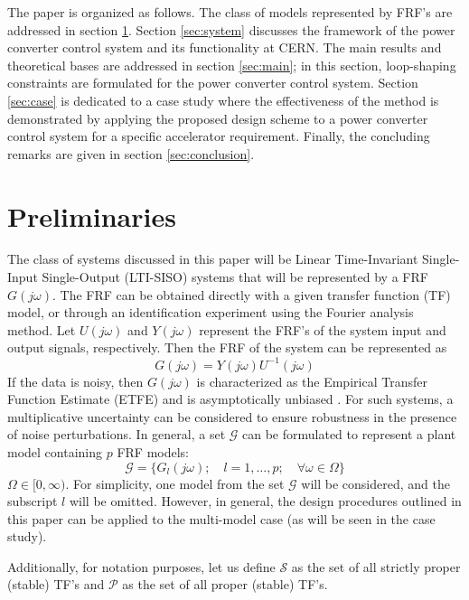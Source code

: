 \documentclass[a4paper, 10pt, conference]{ieeeconf}
\newcommand{\jo}{(j\omega)}
\begin{document}
The paper is organized as follows. The class of models represented by FRF's are addressed in section \ref{sec:prelim}. Section \ref{sec:system} discusses the framework of the power converter control system and its functionality at CERN. The main results and theoretical bases are addressed in section \ref{sec:main}; in this section, loop-shaping constraints are formulated for the power converter control system. Section \ref{sec:case} is dedicated to a case study where the effectiveness of the method is demonstrated by applying the proposed design scheme to a power converter control system for a specific accelerator requirement. Finally, the concluding remarks are given in section \ref{sec:conclusion}.

\section{Preliminaries}
\label{sec:prelim}
The class of systems discussed in this paper will be Linear Time-Invariant Single-Input Single-Output (LTI-SISO) systems that will be represented by a FRF $G\jo$.  The FRF can be obtained directly with a given transfer function (TF) model, or through an identification experiment using the Fourier analysis method. Let $U\jo$ and $Y\jo$ represent the FRF's of the system input and output signals, respectively. Then the FRF of the system can be represented as 
\begin{equation}
G\jo = Y\jo U^{-1}\jo
\end{equation}
If the data is noisy, then $G\jo$ is characterized as the Empirical Transfer Function Estimate (ETFE) and is asymptotically unbiased \cite{Lju99}. For such systems, a multiplicative uncertainty can be considered to ensure robustness in the presence of noise perturbations. In general, a set $\mathcal{G}$ can be formulated to represent a plant model containing $p$ FRF models:
\begin{equation}
\mathcal{G} = \{G_l\jo; \quad l=1,\ldots,p; \quad \forall \omega \in \Omega\}
\end{equation} 
$\Omega \in [0,\infty)$. For simplicity, one model from the set $\mathcal{G}$ will be considered, and the subscript $l$ will be omitted. However, in general, the design procedures outlined in this paper can be applied to the multi-model case (as will be seen in the case study). 

Additionally, for notation purposes, let us define $\mathscr{S}$ as the set of all strictly proper (stable) TF's and $\mathscr{P}$ as the set of all proper (stable) TF's. 
\end{document}
